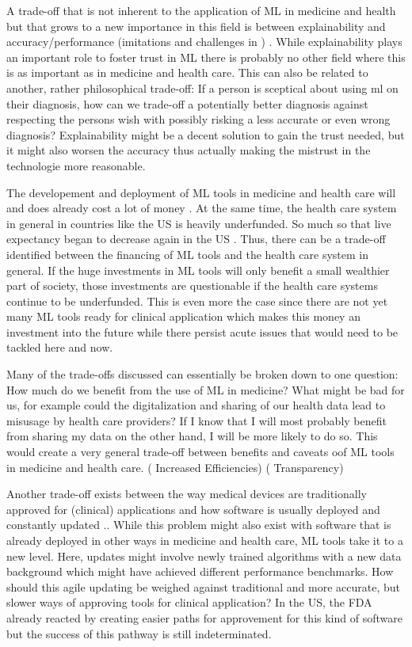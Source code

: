 A trade-off that is not inherent to the application of ML in medicine and health but that grows to a new importance in this field is between explainability and accuracy/performance \cite{topol2019high, kelly2019key} (imitations and challenges in \cite{topol2019high}) . While explainability plays an important role to foster trust in ML there is probably no other field where this is as important as in medicine and health care. This can also be related to another, rather philosophical trade-off: If a person is sceptical about using ml on their diagnosis, how can we trade-off a potentially better diagnosis against respecting the persons wish with possibly risking a less accurate or even wrong diagnosis? Explainability might be a decent solution to gain the trust needed, but it might also worsen the accuracy thus actually making the mistrust in the technologie more reasonable.


The developement and deployment of ML tools in medicine and health care will and does already cost a lot of money  \cite{he2019practical}. At the same time, the health care system in general in countries like the US is heavily underfunded. So much so that live expectancy began to decrease again in the US \cite{topol2019high}. Thus, there can be a trade-off identified between the financing of ML tools and the health care system in general. If the huge investments in ML tools will only benefit a small wealthier part of society, those investments are questionable if the health care systems continue to be underfunded. This is even more the case since there are not yet many ML tools ready for clinical application which makes this money an investment into the future while there persist acute issues that would need to be tackled here and now.


 Many of the trade-offs discussed can essentially be broken down to one question: How much do we benefit from the use of ML in medicine? What might be bad for us, for example could the digitalization and sharing of our health data lead to misusage by health care providers? If I know that I will most probably benefit from sharing my data on the other hand, I will be more likely to do so. This would create a very general trade-off between benefits and caveats oof ML tools in medicine and health care. (\cite{topol2019high} Increased Efficiencies) (\cite{he2019practical} Transparency)


Another trade-off exists between the way medical devices are traditionally approved for (clinical) applications and how software is usually deployed and constantly updated \cite{he2019practical}.. While this problem might also exist with software that is already deployed in other ways in medicine and health care, ML tools take it to a new level. Here, updates might involve newly trained algorithms with a new data background which might have achieved different performance benchmarks. How should this agile updating be weighed against traditional and more accurate, but slower ways of approving tools for clinical application? In the US, the FDA already reacted by creating easier paths for approvement for this kind of software but the success of this pathway is still indeterminated.


